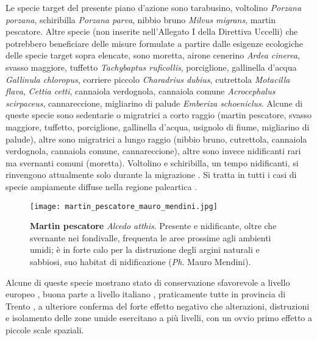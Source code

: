 \documentclass[10pt,twoside,openany,x11names,svgnames,italian,a5paper,dvipsnames,table]{memoir}
\newcommand{\ph}{\emph{Ph}. }
\begin{document}
Le specie target del presente piano d'azione sono tarabusino, voltolino \emph{Porzana porzana}, schiribilla \emph{Porzana parva}, nibbio bruno \emph{Milvus migrans}, martin pescatore. Altre specie (non inserite nell'Allegato I della Direttiva Uccelli) che potrebbero beneficiare delle misure formulate a partire dalle esigenze ecologiche delle specie target sopra elencate, sono moretta, airone cenerino \emph{Ardea cinerea}, svasso maggiore, tuffetto \emph{Tachybaptus ruficollis}, porciglione, gallinella d'acqua \emph{Gallinula chloropus}, corriere piccolo \emph{Charadrius dubius}, cutrettola \emph{Motacilla flava}, \emph{Cettia cetti}, cannaiola verdognola, cannaiola comune \emph{Acrocephalus scirpaceus}, cannareccione, migliarino di palude \emph{Emberiza schoeniclus}. Alcune di queste specie sono sedentarie o migratrici a corto raggio (martin pescatore, svasso maggiore, tuffetto, porciglione, gallinella d'acqua, usignolo di fiume, migliarino di palude), altre sono migratrici a lungo raggio (nibbio bruno, cutrettola, cannaiola verdognola, cannaiola comune, cannareccione), altre sono invece nidificanti rari ma svernanti comuni (moretta). Voltolino e schiribilla, un tempo nidificanti, si rinvengono attualmente solo durante la migrazione \cite{Pedrini05}. Si tratta in tutti i casi di specie ampiamente diffuse nella regione paleartica \cite{Brichetti03}.

\begin{wrapfigure}[17]{l}{.6\textwidth}
\texttt{[image: martin\_pescatore\_mauro\_mendini.jpg]}
\caption*{\textbf{Martin pescatore} \emph{Alcedo atthis}. Presente e nidificante, oltre che svernante nei fondivalle, frequenta le aree prossime agli ambienti umidi; è in forte calo per la distruzione degli argini naturali e sabbiosi, suo habitat di nidificazione (\ph Mauro Mendini).}
\end{wrapfigure}

Alcune di queste specie mostrano stato di conservazione sfavorevole a livello europeo \cite{Birdlife04}, buona parte a livello italiano \cite{Peronace12}, praticamente tutte in provincia di Trento \cite{Pedrini05}, a ulteriore conferma del forte effetto negativo che alterazioni, distruzioni e isolamento delle zone umide esercitano a più livelli, con un ovvio primo effetto a piccole scale spaziali.
\end{document}
